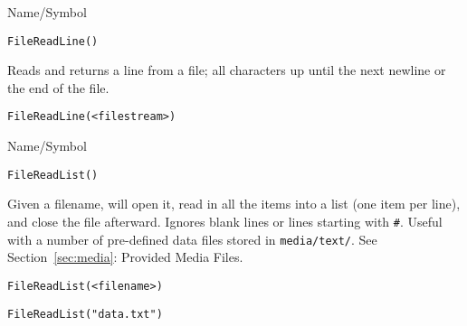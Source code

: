 \begin{desc}{Name/Symbol}
\item[Name/Symbol]	\verb+FileReadLine()+

\item[Description]	Reads and returns a line from a file; all characters up
		until the next newline or the end of the file.

\item[Usage]
\begin{verbatim}
FileReadLine(<filestream>)
\end{verbatim}

\item[Example]	

\item[See Also]	
\end{desc}

\rl




\begin{desc}{Name/Symbol}
\item[Name/Symbol]  	\verb+FileReadList()+
 
\item[Description] Given a filename, will open it, read in all the
  items into a list (one item per line), and close the file afterward.
  Ignores blank lines or lines starting with \verb+#+.  Useful with a
  number of pre-defined data files stored in \verb+media/text/+.  See
  Section~\ref{sec:media}: Provided Media Files.

\item[Usage]
\begin{verbatim}
FileReadList(<filename>)
\end{verbatim}

\item[Example]
\begin{verbatim}
FileReadList("data.txt")
\end{verbatim}

\item[See Also]
\end{desc}

\rl


